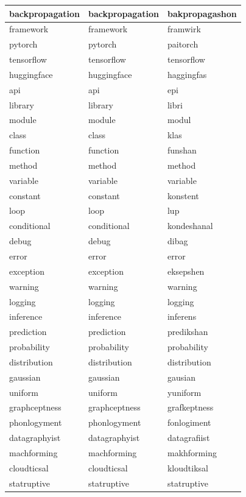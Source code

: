 \documentclass[10pt,twocolumn,letterpaper]{article}
\begin{document}
\begin{longtable}{|p{4cm}|p{4cm}|p{4cm}|}
backpropagation & backpropagation & bakpropagashon \\ \hline
framework & framework & framwirk \\ \hline
pytorch & pytorch & paitorch \\ \hline
tensorflow & tensorflow & tensorflow \\ \hline
huggingface & huggingface & haggingfas \\ \hline
api & api & epi \\ \hline
library & library & libri \\ \hline
module & module & modul \\ \hline
class & class & klas \\ \hline
function & function & funshan \\ \hline
method & method & method \\ \hline
variable & variable & variable \\ \hline
constant & constant & konstent \\ \hline
loop & loop & lup \\ \hline
conditional & conditional & kondeshanal \\ \hline
debug & debug & dibag \\ \hline
error & error & error \\ \hline
exception & exception & eksepshen \\ \hline
warning & warning & warning \\ \hline
logging & logging & logging \\ \hline
inference & inference & inferens \\ \hline
prediction & prediction & predikshan \\ \hline
probability & probability & probability \\ \hline
distribution & distribution & distribution \\ \hline
gaussian & gaussian & gausian \\ \hline
uniform & uniform & yuniform \\ \hline
graphceptness & graphceptness & grafkeptness \\ \hline
phonlogyment & phonlogyment & fonlogiment \\ \hline
datagraphyist & datagraphyist & datagrafiist \\ \hline
machforming & machforming & makhforming \\ \hline
cloudticsal & cloudticsal & kloudtiksal \\ \hline
statruptive & statruptive & statruptive \\ \hline

\end{longtable}
\end{document}
